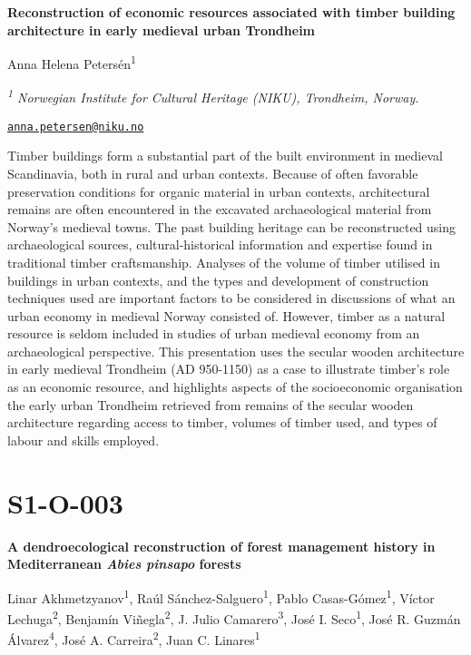 \documentclass[
]{book}
\begin{document}
\textbf{Reconstruction of economic resources associated with timber building architecture in early medieval urban Trondheim}

Anna Helena Petersén\textsuperscript{1}

\emph{\textsuperscript{1} Norwegian Institute for Cultural Heritage (NIKU), Trondheim, Norway.}

\href{mailto:anna.petersen@niku.no}{\nolinkurl{anna.petersen@niku.no}}

Timber buildings form a substantial part of the built environment in medieval Scandinavia, both in rural and urban contexts. Because of often favorable preservation conditions for organic material in urban contexts, architectural remains are often encountered in the excavated archaeological material from Norway's medieval towns. The past building heritage can be reconstructed using archaeological sources, cultural-historical information and expertise found in traditional timber craftsmanship. Analyses of the volume of timber utilised in buildings in urban contexts, and the types and development of construction techniques used are important factors to be considered in discussions of what an urban economy in medieval Norway consisted of. However, timber as a natural resource is seldom included in studies of urban medieval economy from an archaeological perspective. This presentation uses the secular wooden architecture in early medieval Trondheim (AD 950-1150) as a case to illustrate timber's role as an economic resource, and highlights aspects of the socioeconomic organisation the early urban Trondheim retrieved from remains of the secular wooden architecture regarding access to timber, volumes of timber used, and types of labour and skills employed.

\hypertarget{s1-o-003}{%
\section*{S1-O-003}\label{s1-o-003}}

\textbf{A dendroecological reconstruction of forest management history in Mediterranean \emph{Abies pinsapo} forests}

Linar Akhmetzyanov\textsuperscript{1}, Raúl Sánchez-Salguero\textsuperscript{1}, Pablo Casas-Gómez\textsuperscript{1}, Víctor Lechuga\textsuperscript{2}, Benjamín Viñegla\textsuperscript{2}, J. Julio Camarero\textsuperscript{3}, José I. Seco\textsuperscript{1}, José R. Guzmán Álvarez\textsuperscript{4}, José A. Carreira\textsuperscript{2}, Juan C. Linares\textsuperscript{1}
\end{document}
